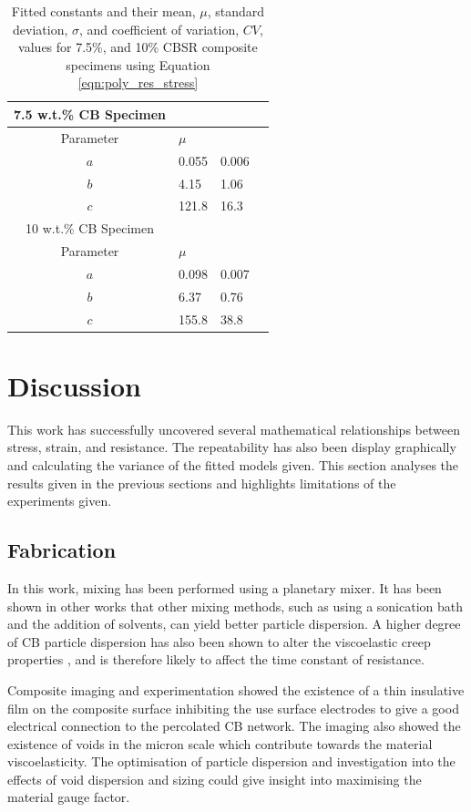 \begin{table}[H]
	\caption{Fitted constants and their mean, $\mu$, standard deviation, $\sigma$, and coefficient of variation, $CV$, values for 7.5\%, and 10\% CBSR composite specimens using Equation \ref{eqn:poly_res_stress}}
	\begin{center}
		\label{tab:generalised_model_constants}
		\begin{tabular}{c l l l}
			7.5 w.t.\% CB Specimen \\
			\hline
			Parameter & $\mu$ \\
			\hline
			$a$ & 0.055 & 0.006 \\
			$b$ & 4.15 & 1.06 \\
			$c$ & 121.8 & 16.3 \\
			\hline
			10 w.t.\% CB Specimen \\
			\hline
			Parameter & $\mu$ \\
			\hline
			$a$ & 0.098 & 0.007 \\
			$b$ & 6.37 & 0.76 \\
			$c$ & 155.8 & 38.8 \\
			\hline
		\end{tabular}
	\end{center}
\end{table}


\section{Discussion}
This work has successfully uncovered several mathematical relationships between stress, strain, and resistance. The repeatability has also been display graphically and calculating the variance of the fitted models given. This section analyses the results given in the previous sections and highlights limitations of the experiments given.

\subsection{Fabrication}
In this work, mixing has been performed using a planetary mixer. It has been shown in other works \cite{Xu2016,Spahr2017} that other mixing methods, such as using a sonication bath and the addition of solvents, can yield better particle dispersion. A higher degree of CB particle dispersion has also been shown to alter the viscoelastic creep properties \cite{Xu2016}, and is therefore likely to affect the time constant of resistance.

Composite imaging and experimentation showed the existence of a thin insulative film on the composite surface inhibiting the use surface electrodes to give a good electrical connection to the percolated CB network. The imaging also showed the existence of voids in the micron scale which contribute towards the material viscoelasticity. The optimisation of particle dispersion and investigation into the effects of void dispersion and sizing could give insight into maximising the material gauge factor.


